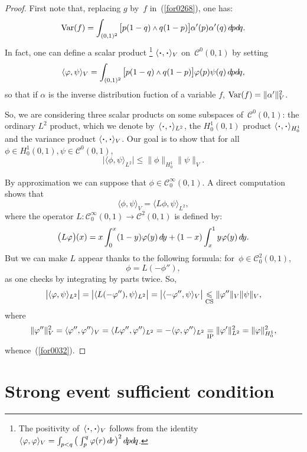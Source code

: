 \begin{proof}
First note that, replacing $g$ by~$f$ in~(\ref{for0268}),
one has:
\[ \Var(f) = \int_{(0,1)^2} \big[ p(1-q) \wedge q(1-p) \big] \alpha'(p)\alpha'(q) \,\dx{p}\dx{q} .\]
In fact, one can define a scalar product%
\footnote{The positivity of~$\langle\Bcdot,\Bcdot\rangle_V$ follows from the identity
$\langle\phi,\phi\rangle_V = \int_{p<q} \big( \int_p^q \phi(r) \,\dx{r} \big)^2 \,\dx{p}\dx{q}$.}
$\langle\Bcdot,\Bcdot\rangle_V$ on~$\mathcal{C}^0(0,1)$ by setting
\[ \label{for0312}
\langle\phi,\psi\rangle_{V} = \int_{(0,1)^2} \big[ p(1-q) \wedge q(1-p) \big] \phi(p)\psi(q) \,\dx{p}\dx{q} ,\]
so that if $\alpha$ is the inverse distribution fuction
of a variable $f$, $\operatorname{Var}(f) = \|\alpha'\|_V^2$.

So, we are considering three scalar products on some subspaces of~$\mathcal{C}^0(0,1)$:
the ordinary $L^2$ product, which we denote by~$\langle\Bcdot,\Bcdot\rangle_{L^2}$,
the $H^1_0(0,1)$ product $\langle\Bcdot,\Bcdot\rangle_{H^1_0}$
and the variance product $\langle\Bcdot,\Bcdot\rangle_{V}$.
Our goal is to show that for all~$\phi \in H^1_0(0,1), \psi \in \mathcal{C}^0(0,1)$,
\[\label{for0032}
\big| \langle \phi,\psi \rangle_{L^2} \big| \leq \|\phi\|_{H^1_0} \|\psi\|_{V} .\]

By approximation we can suppose that $\phi\in\mathcal{C}^{\infty}_0(0,1)$.
A direct computation shows that
\[ \langle\phi,\psi\rangle_V = \langle L\phi,\psi\rangle_{L^2} ,\]
where the operator $L \colon \mathcal{C}^{\infty}_0(0,1) \to \mathcal{C}^2(0,1)$ is defined by:
\[\label{for0269} \big(L\phi\big)(x) = x\int_0^x (1-y)\phi(y) \,\dx{y} + (1-x)\int_x^1 y\phi(y) \,\dx{y} .\]
%
But we can make $L$ appear thanks to the following formula:
for~$\phi \in \mathcal{C}^2_0(0,1)$,
\[ \phi = L(-\phi'') ,\]
as one checks by integrating by parts twice.
So,
\[ \big|\langle\phi,\psi\rangle_{L^2}\big| = \big|\langle L(-\phi''),\psi\rangle_{L^2}\big|
= \big|\langle-\phi'',\psi\rangle_V\big| \footrel{\text{CS}}{\leq} \| \phi'' \|_V \| \psi \|_V ,\]
where
\[ \|\varphi''\|_V^2 = \langle\varphi'',\varphi''\rangle_V = \langle L\varphi'',\varphi''\rangle_{L^2} = -\langle\varphi,\varphi''\rangle_{L^2}
\underset{\text{IP}}{=} \|\varphi'\|_{L^2}^2 = \|\varphi\|_{H^1_0}^2 ,\]
whence~(\ref{for0032}).
\end{proof}


\section{Strong event sufficient condition}\label{parStrongEventSufficientCondition}

